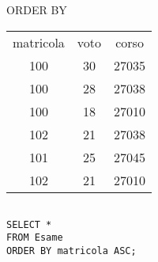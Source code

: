 \begin{frame}{ORDER BY}
\begin{table}[h]
\centering
\begin{minipage}{.45\textwidth}
\centering
\begin{tabular}{|c|c|c|}
\hline
\rowcolor{cyan!30} \multicolumn{3}{|c|}{Esame} \\
\hline
\rowcolor{cyan!30} matricola  & voto & corso \\
\hline
100  & 30 & 27035 \\
100  & 28 & 27038 \\
100  & 18 & 27010 \\
102  & 21 & 27038 \\
101  & 25 & 27045 \\
102 & 21 & 27010 \\
\hline
\end{tabular}
\end{minipage}%
\begin{minipage}{.45\textwidth}
\centering
\begin{tabular}{|c|c|c|}
\hline

\hline
\end{tabular}
\end{minipage}
\end{table}
\vspace{2em}
\texttt{SELECT *\\FROM Esame\\ORDER BY matricola ASC;}
\end{frame}
